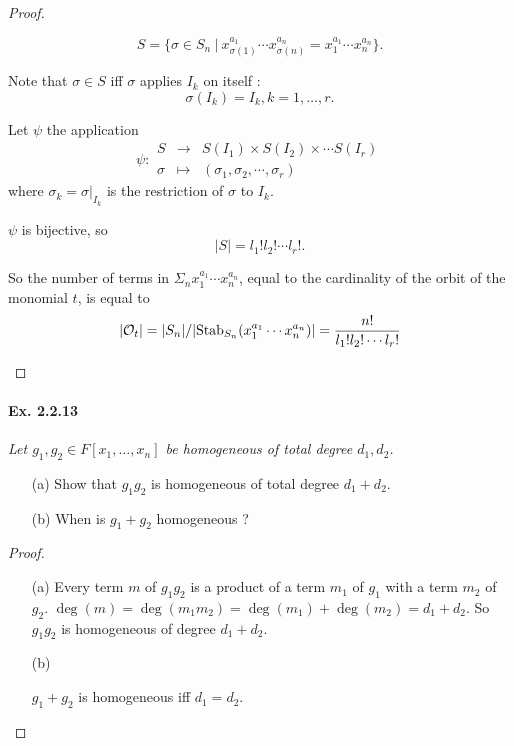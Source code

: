 \documentclass[11pt,a4paper]{article}
\begin{document}
\begin{proof}
\begin{enumerate}
$$S = \{ \sigma \in S_n \ \vert \  x_{\sigma(1)}^{a_1}\cdots x_{\sigma(n)}^{a_n}=x_{1}^{a_1}\cdots x_{n}^{a_n} \}.$$

Note that $\sigma \in S$ iff $\sigma$  applies $I_k$ on itself : $$\sigma(I_k) = I_k, k=1,\ldots,r.$$

Let $\psi$ the application
$$\psi: 
\begin{array}{ccc}
S  & \to  &S(I_1) \times S(I_2)\times \cdots S(I_r)  \\
\sigma  &  \mapsto  &   (\sigma_1,\sigma_2, \cdots,\sigma_r)
\end{array}
$$
where  $\sigma_k = \sigma \vert_{I_k}$ is the restriction of $\sigma$ to $I_k$.

$\psi $ is bijective, so $$\vert S \vert = l_1!l_2!\cdots l_r!.$$

So the number of terms in  $\Sigma_n x_{1}^{a_1}\cdots x_{n}^{a_n}$, equal to the cardinality of the orbit of the monomial $t$, is equal to
$$\vert {\cal O}_t \vert = \vert S_n \vert /  \vert \mathrm{Stab}_{S_n}(x_{1}^{a_1}\cdots x_{n}^{a_n}) \vert = \frac{n!}{l_1!l_2!\cdots l_r!}$$

\end{enumerate}
\end{proof}

\paragraph{Ex. 2.2.13}

{\it Let $g_1,g_2 \in F[x_1,\ldots,x_n]$ be homogeneous of total degree $d_1,d_2$.
\begin{enumerate}
\item[(a)] Show that $g_1g_2$ is homogeneous of total degree $d_1+d_2$.
\item[(b)] When is $g_1+g_2$ homogeneous ?
\end{enumerate}
}

\begin{proof}
\begin{enumerate}
\item[(a)]
Every term $m$ of $g_1g_2$ is a product of a term $m_1$ of $g_1$ with a term $m_2$ of $g_2$.
$\deg(m) = \deg(m_1m_2) = \deg(m_1) + \deg(m_2) = d_1+d_2$.
So $g_1g_2$ is homogeneous of degree $d_1+d_2$.

\item[(b)]

$g_1+g_2$ is homogeneous iff $d_1=d_2$.
\end{enumerate}
\end{proof}
\end{document}
